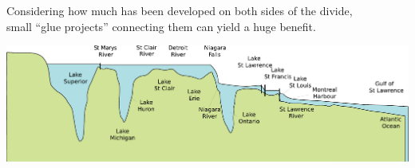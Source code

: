 \documentclass[aspectratio=169]{beamer}
\begin{document}
\begin{frame}{}
\vspace{1 cm}
\begin{center}
\large Considering how much has been developed on both sides of the divide, \\ small ``glue projects'' connecting them can yield a huge benefit.
\end{center}

\vspace{1 cm}
\mbox{\hspace{-1.2 cm}}\includegraphics[width=1.16\linewidth]{great_lakes_levels.pdf}
\vspace{-1 cm}
\end{frame}
\end{document}
